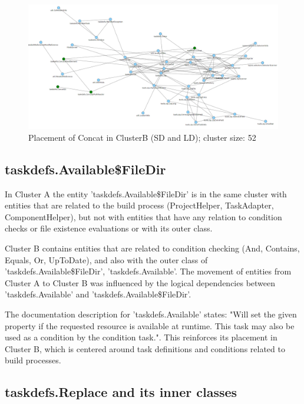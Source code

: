 \documentclass[conference]{IEEEtran}
\begin{document}
\begin{figure}
\centering
\includegraphics[width=\columnwidth]{cluster_concatSDLD.PNG}
\caption{Placement of Concat in ClusterB (SD and LD); cluster size: 52}
\label{fig:clusterBconcat}
\centering
\end{figure}

\subsection{taskdefs.Available\$FileDir}

In Cluster A the entity 'taskdefs.Available\$FileDir' is in the same cluster with entities that are related to the build process (ProjectHelper, TaskAdapter, ComponentHelper), but not with entities that have any relation to condition checks or file existence evaluations or with its outer class. 

Cluster B contains entities that are related to condition checking (And, Contains, Equals, Or, UpToDate), and also with the outer class of 'taskdefs.Available\$FileDir',  'taskdefs.Available'. The movement of entities from Cluster A to Cluster B was influenced by the logical dependencies between 'taskdefs.Available' and 'taskdefs.Available\$FileDir'.

The documentation description for 'taskdefs.Available' states: "Will set the given property if the requested resource is available at runtime. This task may also be used as a condition by the condition task."\cite{ant_concat}.
This reinforces its placement in Cluster B, which is centered around task definitions and conditions related to build processes.



\subsection{ taskdefs.Replace and its inner classes}
\end{document}
